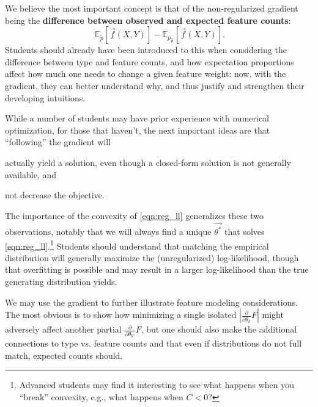 \documentclass[11pt,letterpaper]{article}
\newcommand{\empirical}[0]{\ensuremath{\tilde{p}}}
\begin{document}
We believe the most important concept is that of the non-regularized gradient being the \textbf{difference 
between observed and expected feature counts}:
\begin{equation}
\ \mathbb{E}_{\empirical{}}\left[\vec{f}(X,Y)\right] 
- \mathbb{E}_{p_{\vec{\theta}}}\left[\vec{f}(X,Y)\right].
\label{eqn:obsexp} 
\end{equation}
Students should already have been introduced to this when considering the difference between type and 
feature counts, and how expectation proportions affect how much one needs to change a given feature weight: 
now, with the gradient, they can better understand why, and thus justify and strengthen their developing intuitions.

While a number of students may have prior experience with numerical optimization, for those that haven't, the next 
important ideas are that ``following'' the gradient will
\begin{inparaenum}[i)]
\item actually yield a solution, even though a closed-form solution is not generally available, and
\item not decrease the objective.
\end{inparaenum}
The importance of the convexity of \eqref{eqn:reg_ll} generalizes these two observations, 
notably that we will always find a unique $\vec{\theta^*}$ that solves 
\eqref{eqn:reg_ll}.\footnote{Advanced students may find it interesting to see what happens 
when you ``break'' convexity, e.g., what happens when $C < 0$?}
Students should understand that matching the empirical distribution will generally maximize the (unregularized) log-likelihood, 
though that overfitting is possible and may result in a larger log-likelihood than the true generating distribution yields.

We may use the gradient to further illustrate feature modeling considerations. The most obvious is to show how 
minimizing a single isolated $|\frac{\partial}{\partial \theta_k} F|$ might adversely affect another partial 
$\frac{\partial}{\partial \theta_{k'}}F$, but one should also make the additional connections to type vs. feature counts 
and that even if distributions do not full match, expected counts should.
\end{document}
